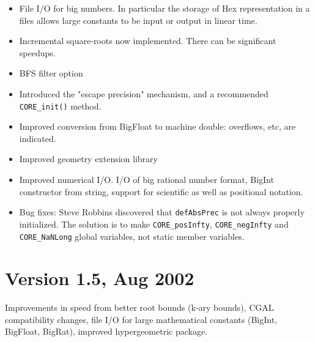 \documentclass[12pt]{article}
\begin{document}
	\begin{itemize}
        \item
	File I/O for big numbers.  In particular the storage of Hex
                representation in a files allows large constants to be
                input or output in linear time.
	\item
        Incremental square-roots now implemented.  There can be
                significant speedups.
 	\item
	BFS filter option
        \item
	Introduced the "escape precision" mechanism, and a recommended
        	{\tt CORE\_init()} method.
	\item
        Improved conversion from BigFloat to machine double: 
                overflows, etc, are indicated.
        \item
	Improved geometry extension library                
	\item
	Improved numerical I/O.
	I/O of big rational number format,
        BigInt constructor from string, support for scientific as well
	as positional notation.
	\item
        Bug fixes: Steve Robbins discovered that
		\texttt{defAbsPrec} is not always properly initialized.
                The solution is to make \texttt{CORE\_posInfty},
                \texttt{CORE\_negInfty} and \texttt{CORE\_NaNLong}
		global variables, not static member variables.
	\end{itemize}

\section{Version 1.5, Aug 2002}
Improvements in speed from better root bounds (k-ary bounds),
        CGAL compatibility changes, file I/O for large mathematical constants
        (BigInt, BigFloat, BigRat), improved hypergeometric package.
\end{document}
